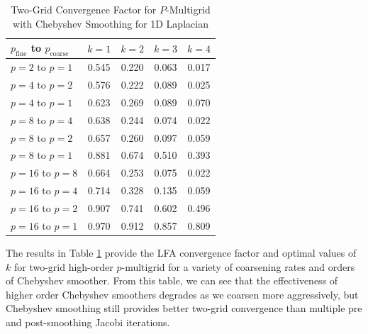 \begin{table}[ht!]
\begin{center}
\begin{tabular}{l c c c c}
  \toprule
  $p_{\text{fine}}$ to $p_{\text{coarse}}$  &  $k = 1$   &  $k = 2$   &  $k = 3$   &  $k = 4$   \\
  \toprule
  $p = 2$ to $p = 1$   &  0.545  &  0.220  &  0.063  &  0.017  \\
  \midrule
  $p = 4$ to $p = 2$   &  0.576  &  0.222  &  0.089  &  0.025  \\
  $p = 4$ to $p = 1$   &  0.623  &  0.269  &  0.089  &  0.070  \\
  \midrule
  $p = 8$ to $p = 4$   &  0.638  &  0.244  &  0.074  &  0.022  \\
  $p = 8$ to $p = 2$   &  0.657  &  0.260  &  0.097  &  0.059  \\
  $p = 8$ to $p = 1$   &  0.881  &  0.674  &  0.510  &  0.393  \\
  \midrule
  $p = 16$ to $p = 8$  &  0.664  &  0.253  &  0.075  &  0.022  \\
  $p = 16$ to $p = 4$  &  0.714  &  0.328  &  0.135  &  0.059  \\
  $p = 16$ to $p = 2$  &  0.907  &  0.741  &  0.602  &  0.496  \\
  $p = 16$ to $p = 1$  &  0.970  &  0.912  &  0.857  &  0.809  \\
  \bottomrule
\end{tabular}
\end{center}
\caption{Two-Grid Convergence Factor for $P$-Multigrid with Chebyshev Smoothing for 1D Laplacian}
\label{table:two_grid_1d_chebyshev}
\end{table}

The results in Table \ref{table:two_grid_1d_chebyshev} provide the LFA convergence factor and optimal values of $k$ for two-grid high-order $p$-multigrid for a variety of coarsening rates and orders of Chebyshev smoother.
From this table, we can see that the effectiveness of higher order Chebyshev smoothers degrades as we coarsen more aggressively, but Chebyshev smoothing still provides better two-grid convergence than multiple pre and post-smoothing Jacobi iterations.

